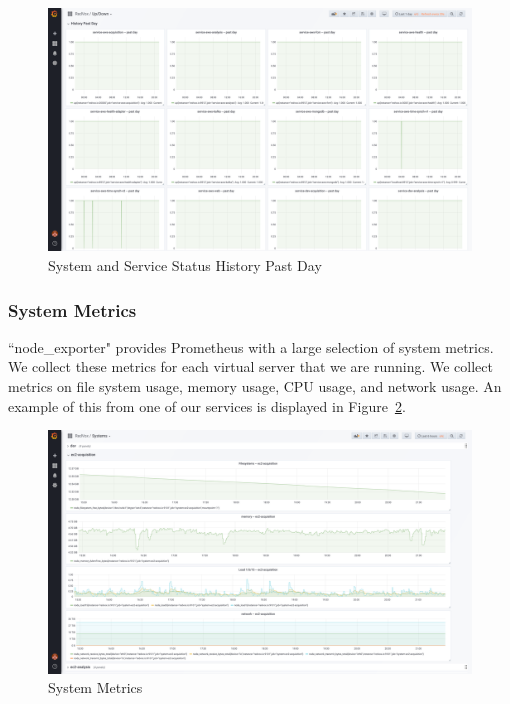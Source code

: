 \begin{figure}
	\centering
	\includegraphics[width=\linewidth]{figures/updownhist.png}
	\caption{System and Service Status History Past Day}
	\label{fig:updownhist}
\end{figure}

\subsubsection{System Metrics}

``node\_exporter" provides Prometheus with a large selection of system metrics. We collect these metrics for each virtual server that we are running. We collect metrics on file system usage, memory usage, CPU usage, and network usage. An example of this from one of our services is displayed in Figure~\ref{fig:systemstats}.

\begin{figure}
	\centering
	\includegraphics[width=\linewidth]{figures/systemstats.png}
	\caption{System Metrics}
	\label{fig:systemstats}
\end{figure}

